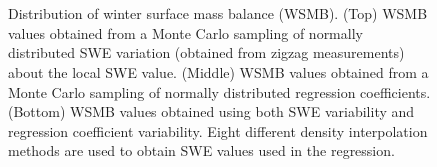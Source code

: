 \documentclass[12pt]{article}
\begin{document}
\begin{figure}[H]
	\centering
	\\%
	\\%
	\caption{Distribution of winter surface mass balance (WSMB). (Top) WSMB values obtained from a Monte Carlo sampling of normally distributed SWE variation (obtained from zigzag measurements) about the local SWE value. (Middle) WSMB values obtained from a Monte Carlo sampling of normally distributed regression coefficients. (Bottom) WSMB values obtained using both SWE variability and regression coefficient variability. Eight different density interpolation methods are used to obtain SWE values used in the regression.}
	\label{fig:WSMB_allDensity}
\end{figure}
\end{document}
